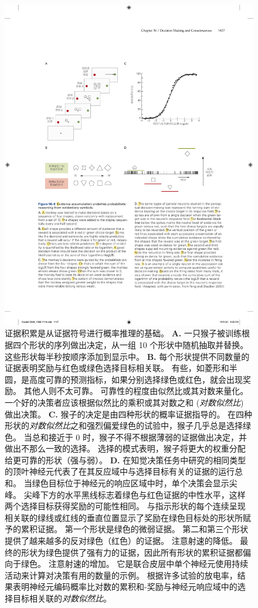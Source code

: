 \begin{figure}[htbp]
	\centering
	\includegraphics[width=0.95\linewidth]{chap56/fig_56_9}
	\caption{证据积累是从证据符号进行概率推理的基础。
		\textbf{A.} 一只猴子被训练根据四个形状的序列做出决定，从一组 10 个形状中随机抽取并替换。
		这些形状每半秒按顺序添加到显示中。
		\textbf{B.} 每个形状提供不同数量的证据表明奖励与红色或绿色选择目标相关联。
		有些，如菱形和半圆，是高度可靠的预测指标，如果分别选择绿色或红色，就会出现奖励。
		其他人则不太可靠。 可靠性的程度由似然比或其对数来量化。
		一个好的决策者应该根据似然比的乘积或其对数之和 (\textit{对数似然比}) 做出决策。
		\textbf{C.} 猴子的决定是由四种形状的概率证据指导的。
		在四种形状的\textit{对数似然比}之和强烈偏爱绿色的试验中，猴子几乎总是选择绿色。
		当总和接近于 0 时，猴子不得不根据薄弱的证据做出决定，并做出不那么一致的选择。
		选择的模式表明，猴子将更大的权重分配给更可靠的形状（强与弱）。
		\textbf{D.} 在知觉决策任务中研究的相同类型的顶叶神经元代表了在其反应域中与选择目标有关的证据的运行总和。
		当绿色目标位于神经元的响应区域中时，单个决策会显示尖峰。
		尖峰下方的水平黑线标志着绿色与红色证据的中性水平，这样两个选择目标获得奖励的可能性相同。
		与指示形状的每个连续呈现相关联的绿线或红线的垂直位置显示了奖励在绿色目标处的形状所赋予的累积证据。
		第一个形状是绿色的微弱证据。
		第二和第三个形状提供了越来越多的反对绿色（红色）的证据。 注意射速的降低。
		最终的形状为绿色提供了强有力的证据，因此所有形状的累积证据都偏向于绿色。
		注意射速的增加。
		它是联合皮层中单个神经元使用持续活动来计算对决策有用的数量的示例。
		根据许多试验的放电率，结果表明神经元编码概率比对数的累积和-奖励与神经元响应域中的选择目标相关联的\textit{对数似然比}\cite{yang2007probabilistic}。}
	\label{fig:56_9}
\end{figure}


